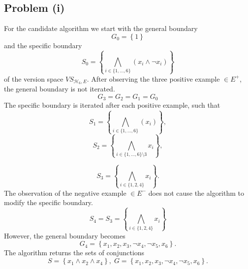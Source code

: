 \subsection*{Problem (i)}

For the candidate algorithm we start with the general boundary 
\[
G_{0}=\left\{ 1\right\} 
\]
and the specific boundary
\[
S_{0}=\left\{ \bigwedge_{i\in\{1,\ldots,6\}}\left(x_{i}\land\lnot x_{i}\right)\right\} 
\]
of the version space $\mathit{VS}_{\mathcal{H}_{6},E}$. After observing
the three positive example $\in E^{+}$, the general boundary is not
iterated. 
\[
G_{3}=G_{2}=G_{1}=G_{0}
\]
The specific boundary is iterated after each positive example, such
that
\[
S_{1}=\left\{ \bigwedge_{i\in\{1,\ldots,6\}}\left(x_{i}\right)\right\} ,
\]
\[
S_{2}=\left\{ \bigwedge_{i\in\{1,\ldots,6\}\setminus3}x_{i}\right\} ,
\]


\[
S_{3}=\left\{ \bigwedge_{i\in\{1,2,4\}}x_{i}\right\} .
\]
The observation of the negative example $\in E^{-}$ does not cause
the algorithm to modify the specific boundary.
\[
S_{4}=S_{3}=\left\{ \bigwedge_{i\in\{1,2,4\}}x_{i}\right\} 
\]
However, the general boundary becomes
\[
G_{4}=\left\{ x_{1},x_{2},x_{3},\lnot x_{4},\lnot x_{5},x_{6}\right\} .
\]
The algorithm returns the sets of conjunctions
\[
S=\left\{ x_{1}\land x_{2}\land x_{4}\right\} ,\; G=\left\{ x_{1},x_{2},x_{3},\lnot x_{4},\lnot x_{5},x_{6}\right\} .
\]